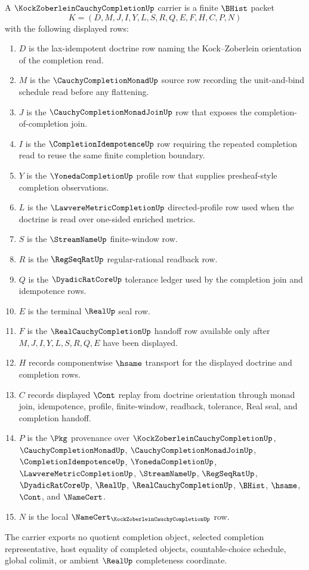 \begin{definition}
\label{def:kock-zoberlein-cauchy-completion-carrier}
A $\KockZoberleinCauchyCompletionUp$ carrier is a finite $\BHist$ packet
$$
K=(D,M,J,I,Y,L,S,R,Q,E,F,H,C,P,N)
$$
with the following displayed rows:
\begin{enumerate}
\item $D$ is the lax-idempotent doctrine row naming the Kock--Zoberlein orientation of the completion read.
\item $M$ is the $\CauchyCompletionMonadUp$ source row recording the unit-and-bind schedule read before any flattening.
\item $J$ is the $\CauchyCompletionMonadJoinUp$ row that exposes the completion-of-completion join.
\item $I$ is the $\CompletionIdempotenceUp$ row requiring the repeated completion read to reuse the same finite completion boundary.
\item $Y$ is the $\YonedaCompletionUp$ profile row that supplies presheaf-style completion observations.
\item $L$ is the $\LawvereMetricCompletionUp$ directed-profile row used when the doctrine is read over one-sided enriched metrics.
\item $S$ is the $\StreamNameUp$ finite-window row.
\item $R$ is the $\RegSeqRatUp$ regular-rational readback row.
\item $Q$ is the $\DyadicRatCoreUp$ tolerance ledger used by the completion join and idempotence rows.
\item $E$ is the terminal $\RealUp$ seal row.
\item $F$ is the $\RealCauchyCompletionUp$ handoff row available only after $M,J,I,Y,L,S,R,Q,E$ have been displayed.
\item $H$ records componentwise $\hsame$ transport for the displayed doctrine and completion rows.
\item $C$ records displayed $\Cont$ replay from doctrine orientation through monad join, idempotence, profile, finite-window, readback, tolerance, Real seal, and completion handoff.
\item $P$ is the $\Pkg$ provenance over $\KockZoberleinCauchyCompletionUp$, $\CauchyCompletionMonadUp$, $\CauchyCompletionMonadJoinUp$, $\CompletionIdempotenceUp$, $\YonedaCompletionUp$, $\LawvereMetricCompletionUp$, $\StreamNameUp$, $\RegSeqRatUp$, $\DyadicRatCoreUp$, $\RealUp$, $\RealCauchyCompletionUp$, $\BHist$, $\hsame$, $\Cont$, and $\NameCert$.
\item $N$ is the local $\NameCert_{\KockZoberleinCauchyCompletionUp}$ row.
\end{enumerate}
The carrier exports no quotient completion object, selected completion representative, host equality of completed objects, countable-choice schedule, global colimit, or ambient $\RealUp$ completeness coordinate.
\end{definition}

